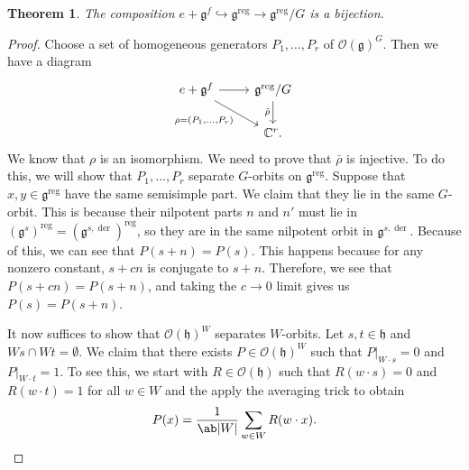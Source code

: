 \documentclass{amsart}
\newtheorem{thm}{Theorem}[section]
\theoremstyle{definition}
\theoremstyle{remark}
\theoremstyle{plain}
\theoremstyle{definition}
\theoremstyle{remark}
\newcommand{\C}{\mathbb{C}}
\newcommand{\g}{\mathfrak{g}}
\newcommand{\h}{\mathfrak{h}}
\newcommand{\mc}[1]{\mathcal{#1}}
\newcommand{\on}[1]{\operatorname{#1}}
\newcommand{\1}{\mathbf{1}}
\newcommand{\2}{\mathbf{2}}
\newcommand{\3}{\mathbf{3}}
\begin{document}
\begin{thm}
    The composition \(e+\g^f \hookrightarrow \g^{\on{reg}} \to \g^{\on{reg}}/G\) is a bijection.
\end{thm}

\begin{proof}
    Choose a set of homogeneous generators \(P_1, \ldots, P_r\) of \(\mc{O}(\g)^G\). Then we have a diagram
    \begin{equation*}
    \begin{tikzcd}
        e + \g^f \ar{r} \ar{dr}[swap]{\rho = (P_1, \ldots, P_r)} & \g^{\on{reg}}/G \ar{d}[swap]{\bar{\rho}} \\
        & \C^r.
    \end{tikzcd}
    \end{equation*}
    We know that \(\rho\) is an isomorphism. We need to prove that \(\bar{\rho}\) is injective. To do this, we will show that \(P_1, \ldots, P_r\) separate \(G\)-orbits on \(\g^{\on{reg}}\). Suppose that \(x,y \in \g^{\on{reg}}\) have the same semisimple part. We claim that they lie in the same \(G\)-orbit. This is because their nilpotent parts \(n\) and \(n'\) must lie in \((\g^s)^{\on{reg}} = (\g^{s, \on{der}})^{\on{reg}}\), so they are in the same nilpotent orbit in \(\g^{s, \on{der}}\). Because of this, we can see that \(P(s+n) = P(s)\). This happens because for any nonzero constant, \(s + cn\) is conjugate to \(s + n\). Therefore, we see that \(P(s+cn) = P(s+n)\), and taking the \(c \to 0\) limit gives us \(P(s) = P(s+n)\).

    It now suffices to show that \(\mc{O}(\h)^W\) separates \(W\)-orbits. Let \(s, t \in \h\) and \(Ws \cap Wt = \emptyset\). We claim that there exists \(P \in \mc{O}(\h)^W\) such that \(P|_{W \cdot s} = 0\) and \(P|_{W \cdot t} = 1\). To see this, we start with \(R \in \mc{O}(\h)\) such that \(R(w \cdot s) = 0\) and \(R(w \cdot t) = 1\) for all \(w \in W\) and the apply the averaging trick to obtain
    \[ P(x) = \frac{1}{\ab|W|} \sum_{w \in W} R(w \cdot x). \qedhere \] 
\end{proof}
\end{document}
